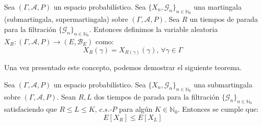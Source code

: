 \begin{definicion}
Sea $(\Gamma , \mathcal{A}, P)$ un espacio probabilístico. Sea $\{X_n, \mathscr{G}_n\}_{n\in \mathds{N}_0}$ una martingala (submartingala, supermartingala) sobre $(\Gamma , \mathcal{A}, P)$. Sea $R$ un tiempos de parada para la filtración $\{\mathscr{G}_n\}_{n\in \mathds{N}_0}$. Entonces definimos la variable aleatoria $X_R:(\Gamma , \mathcal{A}, P)\rightarrow (E,\mathscr{B}_E)$ como:
$$X_R(\gamma) = X_{R(\gamma)}(\gamma)\text{, }\forall \gamma\in\Gamma$$
\end{definicion}

Una vez presentado este concepto, podemos demostrar el siguiente teorema.

\begin{teorema}\label{opcional}
Sea $(\Gamma , \mathcal{A}, P)$ un espacio probabilístico. Sea $\{X_n, \mathscr{G}_n\}_{n\in \mathds{N}_0}$ una submartingala sobre $(\Gamma , \mathcal{A}, P)$. Sean $R, L$ dos tiempos de parada para la filtración $\{\mathscr{G}_n\}_{n\in \mathds{N}_0}$ satisfaciendo que $R\leq L \leq K\text{, }c.s.\text{-}P$ para algún $K\in \mathds{N}_0$. Entonces se cumple que:
$$E[X_{R}]\leq E[X_{L}]$$
\end{teorema}

